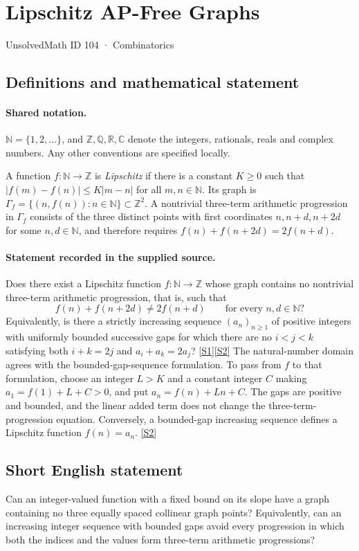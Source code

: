 \documentclass[11pt]{article}
\newcommand{\sref}[2]{\hyperlink{source:#1:#2}{[S#2]}}
\begin{document}
\setcounter{section}{103}
\section{Lipschitz AP-Free Graphs}\label{104}
{\small\sffamily UnsolvedMath ID 104 · Combinatorics}
\subsection{Definitions and mathematical statement}

\paragraph{Shared notation.}$\mathbb N=\{1,2,\ldots\}$, and $\mathbb Z,\mathbb Q,\mathbb R,\mathbb C$ denote the integers, rationals, reals and complex numbers. Any other conventions are specified locally.


A function $f:\mathbb N\to\mathbb Z$ is \emph{Lipschitz} if there is a constant $K\ge0$ such that $|f(m)-f(n)|\le K|m-n|$ for all $m,n\in\mathbb N$. Its graph is $\Gamma_f=\{(n,f(n)):n\in\mathbb N\}\subset\mathbb Z^2$. A nontrivial three-term arithmetic progression in $\Gamma_f$ consists of the three distinct points with first coordinates $n,n+d,n+2d$ for some $n,d\in\mathbb N$, and therefore requires $f(n)+f(n+2d)=2f(n+d)$.
\paragraph{Statement recorded in the supplied source.}
Does there exist a Lipschitz function $f:\mathbb N\to\mathbb Z$ whose graph contains no nontrivial three-term arithmetic progression, that is, such that
\[
f(n)+f(n+2d)\ne2f(n+d)\qquad\text{for every }n,d\in\mathbb N?
\]
Equivalently, is there a strictly increasing sequence $(a_n)_{n\ge1}$ of positive integers with uniformly bounded successive gaps for which there are no $i<j<k$ satisfying both $i+k=2j$ and $a_i+a_k=2a_j$? \sref{104}{1}\sref{104}{2}
The natural-number domain agrees with the bounded-gap-sequence formulation. To pass from $f$ to that formulation, choose an integer $L>K$ and a constant integer $C$ making $a_1=f(1)+L+C>0$, and put $a_n=f(n)+Ln+C$. The gaps are positive and bounded, and the linear added term does not change the three-term-progression equation. Conversely, a bounded-gap increasing sequence defines a Lipschitz function $f(n)=a_n$. \sref{104}{2}
\subsection{Short English statement}
Can an integer-valued function with a fixed bound on its slope have a graph containing no three equally spaced collinear graph points? Equivalently, can an increasing integer sequence with bounded gaps avoid every progression in which both the indices and the values form three-term arithmetic progressions?
\end{document}

